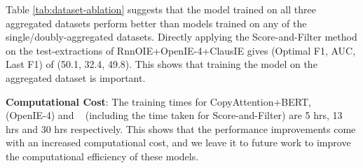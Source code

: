         \begin{table}[h]
            \caption{\shortname{} trained with different combinations of bootstrapping data from 3 systems - OpenIE-4, ClausIE, RNNOIE. Graph filtering is not used over single datasets.}
            \label{tab:dataset-ablation}
        \end{table}

        Table \ref{tab:dataset-ablation} suggests that the model trained on all three aggregated datasets perform better than models trained on any of the single/doubly-aggregated datasets. Directly applying the Score-and-Filter method on the test-extractions of RnnOIE+OpenIE-4+ClausIE gives (Optimal F1, AUC, Last F1) of (50.1, 32.4, 49.8). This shows that training the model on the aggregated dataset is important.

        \vspace{0.5ex}
        \noindent\textbf{Computational Cost}:
        The training times for CopyAttention+BERT, \shortname~ (OpenIE-4) and \shortname~ (including the time taken for Score-and-Filter) are 5 hrs, 13 hrs and 30 hrs respectively. This shows that the performance improvements come with an increased computational cost, and we leave it to future work to improve the computational efficiency of these models.



